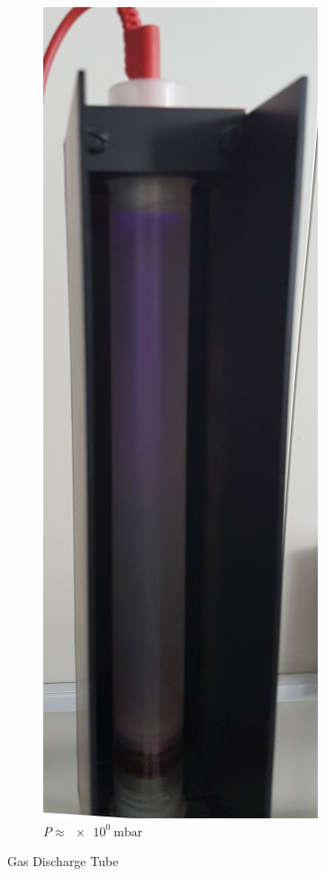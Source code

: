 \begin{figure}[b!]
	\begin{subfigure}{.3\linewidth}
		\centering
		\includegraphics[width=.7\linewidth,trim={0 0 0  1.4cm},clip]{img/discharge-2.jpg}
		\caption{$P \approx \SI{e0}{\milli\bar}$}
	\end{subfigure}
	\caption{Gas Discharge Tube}
\end{figure}
